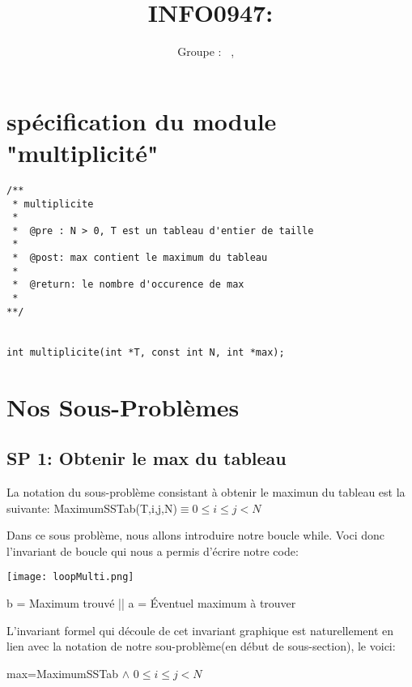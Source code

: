 \documentclass[a4paper, 11pt, oneside]{article}
\title{INFO0947: \intitule}
\author{Groupe \GrNbr : \PrenomUN~\textsc{\NomUN}, \PrenomDEUX~\textsc{\NomDEUX}}
\date{}
\newcommand{\tablemat}{~}
\renewcommand{\tablemat}{\tableofcontents}
\begin{document}
\maketitle
\newpage
\tablemat
\newpage



\section{spécification du module "multiplicité"}

\begin{lstlisting}[caption={Spécifications}]
/**
 * multiplicite
 *
 *  @pre : N > 0, T est un tableau d'entier de taille
 *
 *  @post: max contient le maximum du tableau
 *
 *  @return: le nombre d'occurence de max
 *
**/


int multiplicite(int *T, const int N, int *max);

\end{lstlisting}



\section{Nos Sous-Problèmes}

\subsection{SP 1: Obtenir le max du tableau}

La notation du sous-problème consistant à obtenir le maximun du tableau est la suivante:
MaximumSSTab(T,i,j,N)$ \equiv 0 \le i \le j < N$

\bigskip
Dans ce sous problème, nous allons introduire notre boucle while. Voci donc l'invariant de boucle qui nous a permis d'écrire notre code:

\centering
\texttt{[image: loopMulti.png]}

b = Maximum trouvé ||
a = Éventuel maximum à trouver

\flushleft
\setlength{\parindent}{0.5cm}

L'invariant formel qui découle de cet invariant graphique est naturellement en lien avec la notation de notre sou-problème(en début de sous-section), le voici:

max=MaximumSSTab $\land$ $ 0 \le i \le j < N$
\end{document}
